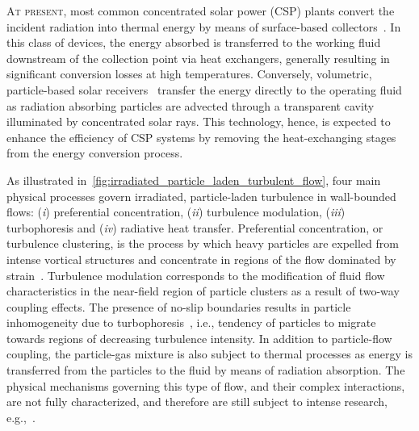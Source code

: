\lettrine{A}{t present,} most common concentrated solar power (CSP) plants convert the incident radiation into thermal energy by means of surface-based collectors~\citep{Ho2014-A}.
In this class of devices, the energy absorbed is transferred to the working fluid downstream of the collection point via heat exchangers, generally resulting in significant conversion losses at high temperatures.
Conversely, volumetric, particle-based solar receivers~\citep{Ho2017-A} transfer the energy directly to the operating fluid as radiation absorbing particles are advected through a transparent cavity illuminated by concentrated solar rays.
This technology, hence, is expected to enhance the efficiency of CSP systems by removing the heat-exchanging stages from the energy conversion process.

As illustrated in~\cref{fig:irradiated_particle_laden_turbulent_flow}, four main physical processes govern irradiated, particle-laden turbulence in wall-bounded flows: (\emph{i}) preferential concentration, (\emph{ii}) turbulence modulation, (\emph{iii}) turbophoresis and (\emph{iv}) radiative heat transfer.
Preferential concentration, or turbulence clustering, is the process by which heavy particles are expelled from intense vortical structures and concentrate in regions of the flow dominated by strain~\citep{Balachandar2010-A}.
Turbulence modulation corresponds to the modification of fluid flow characteristics in the near-field region of particle clusters as a result of two-way coupling effects.
The presence of no-slip boundaries results in particle inhomogeneity due to turbophoresis~\citep{Caporaloni1975-A}, i.e., tendency of particles to migrate towards regions of decreasing turbulence intensity.
In addition to particle-flow coupling, the particle-gas mixture is also subject to thermal processes as energy is transferred from the particles to the fluid by means of radiation absorption.
The physical mechanisms governing this type of flow, and their complex interactions, are not fully characterized, and therefore are still subject to intense research, e.g.,~\citep{Zamansky2014-A,Frankel2016-A,Pouransari2017-A}.

